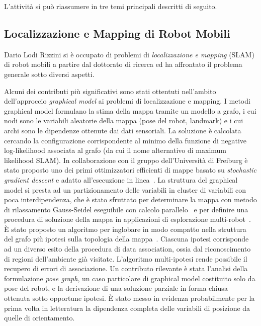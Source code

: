 \documentclass[11pt]{article}
\begin{document}
L'attivit\`a si pu\`o riassumere in tre temi principali descritti di seguito.  

\subsection*{Localizzazione e Mapping di Robot Mobili}

Dario Lodi Rizzini si \`e occupato di problemi di  \emph{localizzazione e mapping} (SLAM) di robot mobili a partire dal dottorato di ricerca ed ha affrontato il problema generale sotto diversi aspetti.

Alcuni dei contributi pi\`u significativi sono stati ottentuti nell'ambito dell'approccio \emph{graphical model} ai problemi di localizzazione e mapping. 
I metodi graphical model formulano la stima della mappa tramite un modello a grafo, i cui nodi sono le variabili aleatorie della mappa (pose del robot, landmark) e i cui archi sono le dipendenze ottenute dai dati sensoriali. 
La soluzione \`e calcolata cercando la configurazione corrispondente al minimo della funzione di negative log-likelihood associata al grafo (da cui il nome alternativo di maximum likelihood SLAM). 
In collaborazione con il gruppo dell'Universit\`a di Freiburg \`e stato proposto uno dei primi ottimizzatori efficienti di mappe basato su \emph{stochastic gradient descent} e adatto all'esecuzione in linea~\cite{grisetti2008icra,lodirizzini2009ras}. 
La struttura del graphical model si presta ad un partizionamento delle variabili in cluster di variabili con poca interdipendenza, che \`e stato sfruttato per determinare la mappa con metodo di rilassamento Gauss-Seidel eseguibile con calcolo parallelo~\cite{lodirizzini2009iros} e per definire una procedura di soluzione della mappa in applicazioni di esplorazione multi-robot~\cite{lodirizzini2010iros,lodirizzini2010graphbot}. 
\`E stato proposto un algoritmo per inglobare in modo compatto nella struttura del grafo pi\`u ipotesi sulla topologia della mappa~\cite{lodirizzini2011icra}. 
Ciascuna ipotesi corrisponde ad un diverso esito della procedura di data association, ossia dal riconoscimento di regioni dell'ambiente gi\`a visitate. 
L'algoritmo multi-ipotesi rende possibile il recupero di errori di associazione. 
Un contributo rilevante \`e stata l'analisi della formulazione \emph{pose graph}, un caso particolare di graphical model costituito solo da pose del robot, e la derivazione di una soluzione parziale in forma chiusa~\cite{lodirizzini2009ecmr,lodirizzini2009icar} ottenuta sotto opportune ipotesi. 
\`E stato messo in evidenza probabilmente per la prima volta in letteratura la dipendenza completa delle variabili di posizione da quelle di orientamento. 
\end{document}
